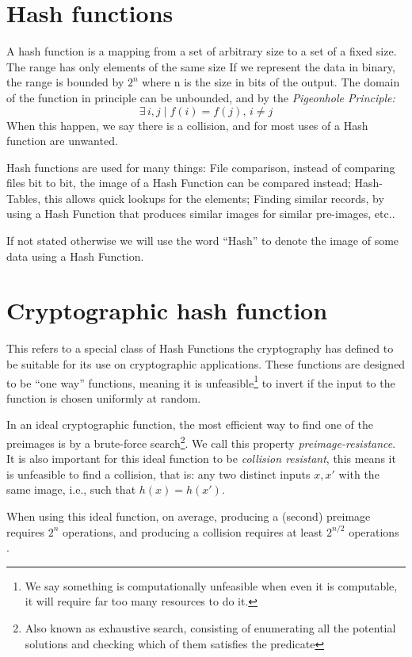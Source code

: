 \section{Hash functions}
A hash function is a mapping from a set of arbitrary size to a set of a fixed
  size.
The range has only elements of the same size
If we represent the data in binary, the range is bounded by $2^n$ where n
  is the size in bits of the output.
The domain of the function in principle can be unbounded, and by the
  \textit{Pigeonhole Principle:}
\begin{equation}
    \mathit{\exists \, i, j \mid f(i) = f(j), \, i \neq j}
\end{equation}
When this happen, we say there is a collision, and for most uses of a Hash
  function are unwanted.

Hash functions are used for many things: File comparison, instead of comparing
  files bit to bit, the image of a Hash Function can be compared instead;
  Hash-Tables, this allows quick lookups for the elements; Finding similar
  records, by using a Hash Function that produces similar images for similar
  pre-images, etc..

If not stated otherwise we will use the word ``Hash'' to denote the image of
  some data using a Hash Function.

\section{Cryptographic hash function}
This refers to a special class of Hash Functions the cryptography has defined
  to be suitable for its use on cryptographic applications. These functions are
  designed to be ``one way'' functions, meaning it is unfeasible\footnote{We %
  say something is computationally unfeasible when even it is computable, it
  will require far too many resources to do it.} to invert if the input to the
  function is chosen uniformly at random.

In an ideal cryptographic function, the most efficient way to find one of the
  preimages is by a brute-force search\footnote{Also known as exhaustive search,
  consisting of enumerating all the potential solutions and checking which of
  them satisfies the predicate}. We call this property
  \textit{preimage-resistance}.
It is also important for this ideal function to be \textit{collision
  resistant}, this means it is unfeasible to find a collision, that is: any two
  distinct inputs $x, x'$ with the same image, i.e., such that $h(x) = h(x')$.

When using this ideal function, on average, producing a (second) preimage
  requires $2^n$ operations, and producing a collision requires at least
  $2^{n / 2} $ operations \cite{preneel1993analysis}.
